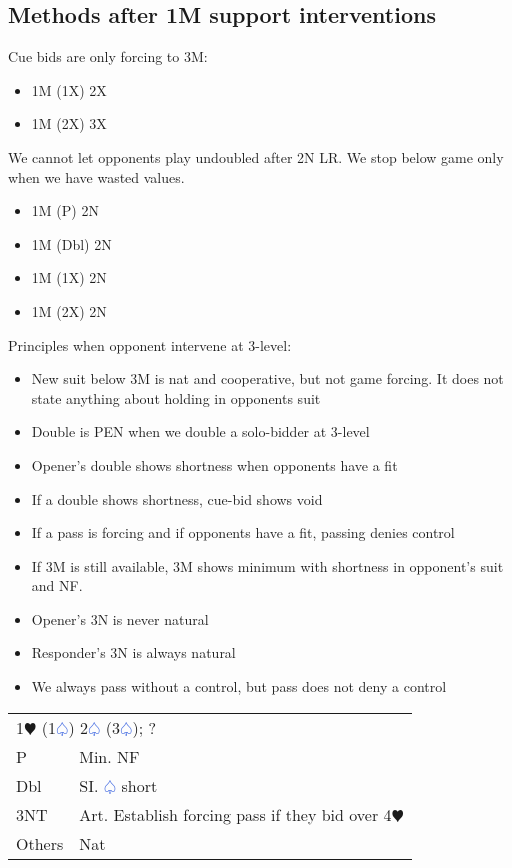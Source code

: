 \documentclass{article}
\renewcommand{\sp}{\textcolor{RoyalBlue}{$\varspade$}}
\newcommand{\he}{\textcolor{RubineRed}{$\varheart$}}
\newcommand{\nt}{\relsize{-1}NT\relsize{1}}
\begin{document}
\subsection{Methods after 1M support interventions}

Cue bids are only forcing to 3M:
\begin{itemize}
	\itemsep0em
	\item 1M (1X) 2X
	\item 1M (2X) 3X
\end{itemize}

We cannot let opponents play undoubled after 2N LR. We stop below game only when we have wasted values.
\begin{itemize}
	\itemsep0em
	\item 1M (P) 2N
	\item 1M (Dbl) 2N
	\item 1M (1X) 2N
	\item 1M (2X) 2N
\end{itemize}

Principles when opponent intervene at 3-level:
\begin{itemize}
	\itemsep0em
	\item New suit below 3M is nat and cooperative, but not game forcing. It does not state anything about holding in opponents suit
	\item Double is PEN when we double a solo-bidder at 3-level
	\item Opener's double shows shortness when opponents have a fit
	\item If a double shows shortness, cue-bid shows void
	\item If a pass is forcing and if opponents have a fit, passing denies control
	\item If 3M is still available, 3M shows minimum with shortness in opponent's suit and NF.
	\item Opener's 3N is never natural
	\item Responder's 3N is always natural
	\item We always pass without a control, but pass does not deny a control
\end{itemize}

\begin{tabular}{|l|p{6.5cm}}
	\multicolumn{2}{l}{1\he{} (1\sp{}) 2\sp{} (3\sp{}); ? }\\
	P & Min. NF \\
	Dbl & SI. \sp{} short \\
	3\nt{} & Art. Establish forcing pass if they bid over 4\he{} \\
	Others & Nat \\
\end{tabular}
\end{document}
